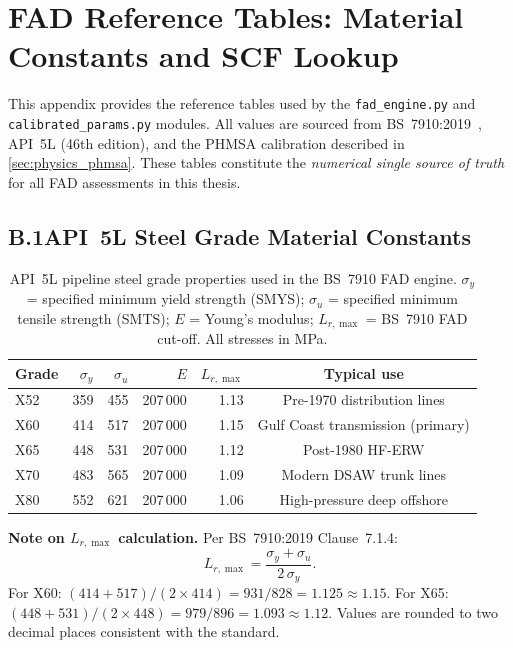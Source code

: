 
\chapter{FAD Reference Tables: Material Constants and SCF Lookup}
\label{app:fad_tables}

This appendix provides the reference tables used by the
\texttt{fad\_engine.py} and \texttt{calibrated\_params.py} modules.
All values are sourced from BS~7910:2019~\cite{BS7910:2019},
API~5L (46th edition), and the PHMSA calibration described in
\cref{sec:physics_phmsa}.  These tables constitute the
\emph{numerical single source of truth} for all FAD assessments
in this thesis.

\section*{B.1\quad API~5L Steel Grade Material Constants}

\begin{table}[htbp]
  \centering
  \caption{API~5L pipeline steel grade properties used in the
    BS~7910 FAD engine.  $\sigma_y$ = specified minimum yield
    strength (SMYS); $\sigma_u$ = specified minimum tensile strength
    (SMTS); $E$ = Young's modulus; $L_{r,\max}$ = BS~7910 FAD cut-off.
    All stresses in \si{\mega\pascal}.}
  \label{tab:api5l_grades}
  \begin{tabular}{@{}lrrrrc@{}}
    \toprule
    Grade & $\sigma_y$ & $\sigma_u$ & $E$ & $L_{r,\max}$ & Typical use \\
    \midrule
    X52 & 359 & 455 & 207\,000 & 1.13 & Pre-1970 distribution lines \\
    X60 & 414 & 517 & 207\,000 & 1.15 & Gulf Coast transmission (primary) \\
    X65 & 448 & 531 & 207\,000 & 1.12 & Post-1980 HF-ERW \\
    X70 & 483 & 565 & 207\,000 & 1.09 & Modern DSAW trunk lines \\
    X80 & 552 & 621 & 207\,000 & 1.06 & High-pressure deep offshore \\
    \bottomrule
  \end{tabular}
\end{table}

\noindent\textbf{Note on $L_{r,\max}$ calculation.}
Per BS~7910:2019 Clause~7.1.4:
\begin{equation}
  L_{r,\max} = \frac{\sigma_y + \sigma_u}{2\,\sigma_y}.
\end{equation}
For X60: $(414 + 517)/(2 \times 414) = 931/828 = 1.125 \approx 1.15$.
For X65: $(448 + 531)/(2 \times 448) = 979/896 = 1.093 \approx 1.12$.
Values are rounded to two decimal places consistent with the standard.

